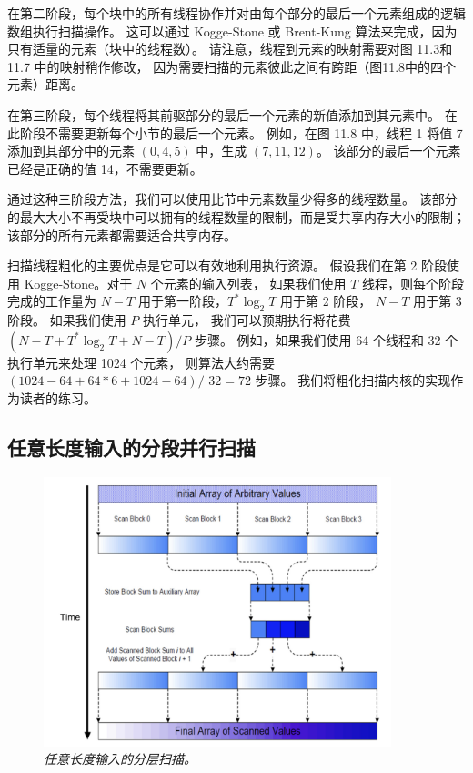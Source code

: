 在第二阶段，每个块中的所有线程协作并对由每个部分的最后一个元素组成的逻辑数组执行扫描操作。 
这可以通过 Kogge-Stone 或 Brent-Kung 算法来完成，因为只有适量的元素（块中的线程数）。 
请注意，线程到元素的映射需要对图 11.3和11.7 中的映射稍作修改，
因为需要扫描的元素彼此之间有跨距（图11.8中的四个元素）距离。

在第三阶段，每个线程将其前驱部分的最后一个元素的新值添加到其元素中。 在此阶段不需要更新每个小节的最后一个元素。 
例如，在图 11.8 中，线程 1 将值 7 添加到其部分中的元素 $(0,4,5)$ 中，生成 $(7,11,12)$。 
该部分的最后一个元素已经是正确的值 14，不需要更新。

通过这种三阶段方法，我们可以使用比节中元素数量少得多的线程数量。 
该部分的最大大小不再受块中可以拥有的线程数量的限制，而是受共享内存大小的限制； 该部分的所有元素都需要适合共享内存。

扫描线程粗化的主要优点是它可以有效地利用执行资源。 假设我们在第 2 阶段使用 Kogge-Stone。对于 $N$ 个元素的输入列表，
如果我们使用 $T$ 线程，则每个阶段完成的工作量为 $N-T$ 用于第一阶段，$T^{*} \log _{2} T$ 用于第 2 阶段，
$N-T$ 用于第 3 阶段。 如果我们使用 $P$ 执行单元，
我们可以预期执行将花费 $\left(N-T+T^{*} \log _{2} T+N-T\right) / P$ 步骤。 
例如，如果我们使用 64 个线程和 32 个执行单元来处理 1024 个元素，
则算法大约需要 $(1024-64+64 * 6+1024-64) /$ $32=72$ 步骤。 我们将粗化扫描内核的实现作为读者的练习。

\subsection{任意长度输入的分段并行扫描}
\begin{figure}[H]
	\centering
	\includegraphics[width=0.9\textwidth]{figs/F11.9.png}
	\caption{\textit{任意长度输入的分层扫描。}}
\end{figure}

